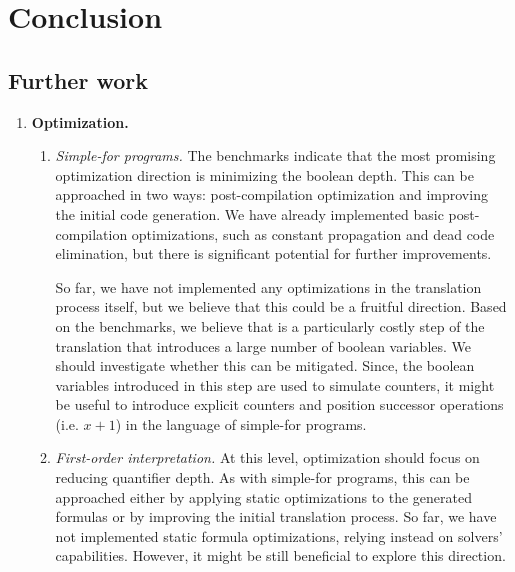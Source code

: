 \section{Conclusion}
\label{sec:conclusion}


\subsection{Further work}
\begin{enumerate}
    \item \textbf{Optimization.}
    \begin{enumerate}
        \item \emph{Simple-for programs.} The benchmarks indicate that the most promising optimization direction is minimizing the boolean depth.
        This can be approached in two ways: post-compilation optimization and improving the initial code generation. 
        We have already implemented basic post-compilation optimizations,
        such as constant propagation and dead code elimination,
        but there is significant potential for further improvements.
    
        So far, we have not implemented any optimizations in the translation process itself, but we believe that this could be a fruitful direction.
        Based on the benchmarks, we believe that  is a particularly costly step of the translation
        that introduces a large number of boolean variables. We should investigate whether this can be mitigated. Since, the boolean variables introduced
        in this step are used to simulate counters, it might be useful to introduce explicit counters and position successor operations (i.e. $x + 1$)
        in the language of simple-for programs.
    
        \item \emph{First-order interpretation.} At this level, optimization should focus on reducing quantifier depth.
        As with simple-for programs, this can be approached either by applying static optimizations
        to the generated formulas or by improving the initial translation process. 
        So far, we have not implemented static formula optimizations, relying instead on solvers' capabilities.
        However, it might be still beneficial to explore this direction.
    

\end{enumerate}
\end{enumerate}
